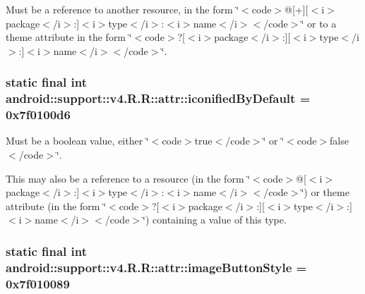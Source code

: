 Must be a reference to another resource, in the form \char`\"{}$<$code$>$@\mbox{[}+\mbox{]}\mbox{[}$<$i$>$package$<$/i$>$:\mbox{]}$<$i$>$type$<$/i$>$:$<$i$>$name$<$/i$>$$<$/code$>$\char`\"{} or to a theme attribute in the form \char`\"{}$<$code$>$?\mbox{[}$<$i$>$package$<$/i$>$:\mbox{]}\mbox{[}$<$i$>$type$<$/i$>$:\mbox{]}$<$i$>$name$<$/i$>$$<$/code$>$\char`\"{}. \hypertarget{classandroid_1_1support_1_1v4_1_1_r_1_1attr_3f950dc7148d83204da2ad3e699f5815}{
\subsubsection[{iconifiedByDefault}]{\setlength{\rightskip}{0pt plus 5cm}static final int android::support::v4.R.R::attr::iconifiedByDefault = 0x7f0100d6}}
\label{classandroid_1_1support_1_1v4_1_1_r_1_1attr_3f950dc7148d83204da2ad3e699f5815}


Must be a boolean value, either \char`\"{}$<$code$>$true$<$/code$>$\char`\"{} or \char`\"{}$<$code$>$false$<$/code$>$\char`\"{}. 

This may also be a reference to a resource (in the form \char`\"{}$<$code$>$@\mbox{[}$<$i$>$package$<$/i$>$:\mbox{]}$<$i$>$type$<$/i$>$:$<$i$>$name$<$/i$>$$<$/code$>$\char`\"{}) or theme attribute (in the form \char`\"{}$<$code$>$?\mbox{[}$<$i$>$package$<$/i$>$:\mbox{]}\mbox{[}$<$i$>$type$<$/i$>$:\mbox{]}$<$i$>$name$<$/i$>$$<$/code$>$\char`\"{}) containing a value of this type. \hypertarget{classandroid_1_1support_1_1v4_1_1_r_1_1attr_b787b3860ec097d27cbab1145d9465cb}{
\subsubsection[{imageButtonStyle}]{\setlength{\rightskip}{0pt plus 5cm}static final int android::support::v4.R.R::attr::imageButtonStyle = 0x7f010089}}
\label{classandroid_1_1support_1_1v4_1_1_r_1_1attr_b787b3860ec097d27cbab1145d9465cb}


